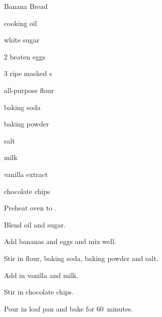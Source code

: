 \begin{recipe}{Banana Bread}{}{}

\begin{ingredients}
\item \C{\half} cooking oil
\item {} white sugar
\item 2 beaten eggs
\item 3 ripe mashed s
\item {} all-purpose flour
\item {} baking soda
\item \tp{\half} baking powder
\item \tp{\half} salt
\item {} milk
\item \tp{\half} vanilla extract
\item {} chocolate chips
\end{ingredients}

\begin{directions}
\item Preheat oven to .
\item Blend oil and sugar.
\item Add bananas and eggs and mix well.
\item Stir in flour, baking soda, baking powder and salt.
\item Add in vanilla and milk.
\item Stir in chocolate chips.
\item Pour in loaf pan and bake for 60~minutes.
\end{directions}

\end{recipe}
